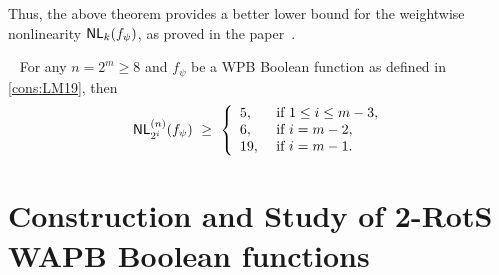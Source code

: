 \documentclass{llncs}
\begin{document}
Thus, the above theorem provides a better lower bound for the weightwise nonlinearity $\mathsf{NL}_{k}(f_\psi)$, as proved in the paper~\cite{DCC:LiuMes19}. 
\begin{proposition}~\cite{DCC:LiuMes19}
For any $n = 2^m \geq 8$ and $f_\psi$ be a WPB Boolean function as defined in \ref{cons:LM19}, then $$\mathsf{NL}_{2^i}^{(n)}(f_\psi) ~\geq ~ \left \{ 
\begin{array}{ll}
5,  &  \text{ if } 1 \leq i \leq m-3, \\
6,  &  \text{ if } i = m-2, \\
19, &  \text{ if } i = m-1.
\end{array} \right. $$	
\end{proposition}

\section{Construction and Study of 2-RotS WAPB Boolean functions}
\end{document}

